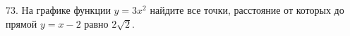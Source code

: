73. На графике функции $y=3x^2$ найдите все точки, расстояние от которых до прямой $y=x-2$ равно $2\sqrt{2}.$\\
